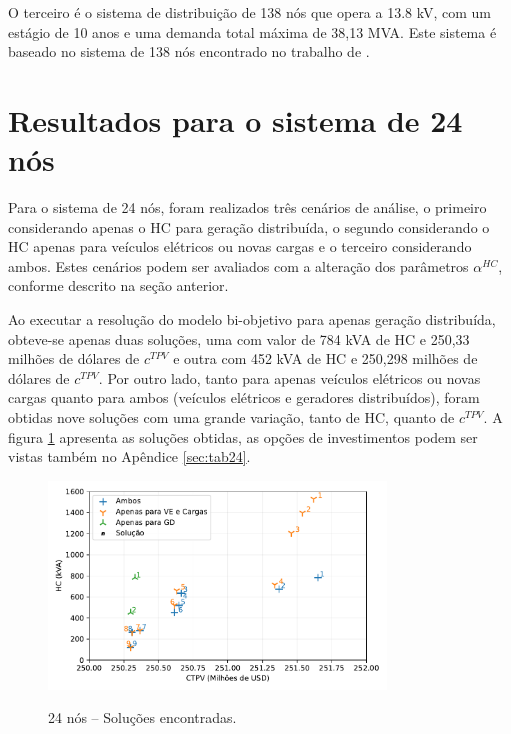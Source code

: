O terceiro é o sistema de distribuição de 138 nós que opera a 13.8 kV, com um estágio de 10 anos e uma demanda total máxima de 38,13 MVA. Este sistema é baseado no sistema de 138 nós encontrado no trabalho de .





\section{Resultados para o sistema de 24 nós}

Para o sistema de 24 nós, foram realizados três cenários de análise, o primeiro considerando apenas o \ac{HC} para geração distribuída, o segundo considerando o \ac{HC} apenas para veículos elétricos ou novas cargas e o terceiro considerando ambos. Estes cenários podem ser avaliados com a alteração dos parâmetros $\alpha^{HC}$, conforme descrito na seção anterior.

Ao executar a resolução do modelo bi-objetivo para apenas geração distribuída, obteve-se apenas duas soluções, uma com valor de 784 kVA de \ac{HC} e 250,33 milhões de dólares de $c^{TPV}$ e outra com 452 kVA de \ac{HC} e 250,298 milhões de dólares de $c^{TPV}$. Por outro lado, tanto para apenas veículos elétricos ou novas cargas quanto para ambos (veículos elétricos e geradores distribuídos), foram obtidas nove soluções com uma grande variação, tanto de \ac{HC}, quanto de $c^{TPV}$. A figura \ref{fig:24_pareto} apresenta as soluções obtidas, as opções de investimentos podem ser vistas também no Apêndice \ref{sec:tab24}.

\begin{figure}[ht]
 	\centering
    \caption{24 nós -- Soluções encontradas.}
    \includegraphics[width=0.8\textwidth]{cap4/resultados/24_pareto.pdf}\\
    \label{fig:24_pareto}
\end{figure}


